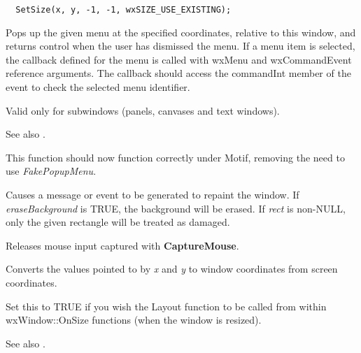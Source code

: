 \begin{verbatim}
  SetSize(x, y, -1, -1, wxSIZE_USE_EXISTING);
\end{verbatim}

\label{popupmenu}


Pops up the given menu at the specified coordinates, relative to this
window, and returns control when the user has dismissed the menu. If a
menu item is selected, the callback defined for the menu is called with
wxMenu and wxCommandEvent reference arguments. The callback should access
the commandInt member of the event to check the selected menu identifier.

Valid only for subwindows (panels, canvases and text windows).

See also .

This function should now function correctly under Motif, removing the
need to use {\it FakePopupMenu}.



Causes a message or event to be generated to repaint the
window. If {\it eraseBackground} is TRUE, the background will be
erased. If {\it rect} is non-NULL, only the given rectangle will
be treated as damaged.



Releases mouse input captured with {\bf CaptureMouse}.



Converts the values pointed to by {\it x} and {\it y} to window
coordinates from screen coordinates.

\label{winsetautolayout}


Set this to TRUE if you wish the Layout function to be called
from within wxWindow::OnSize functions (when the window is resized).

See also .

